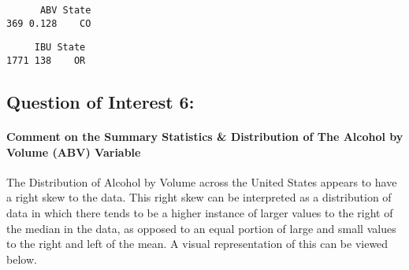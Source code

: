 \documentclass[
]{article}
\newenvironment{Shaded}{\begin{snugshade}}{\end{snugshade}}
\newcommand{\CommentTok}[1]{\textcolor[rgb]{0.56,0.35,0.01}{\textit{#1}}}
\newcommand{\FunctionTok}[1]{\textcolor[rgb]{0.00,0.00,0.00}{#1}}
\newcommand{\NormalTok}[1]{#1}
\newcommand{\OtherTok}[1]{\textcolor[rgb]{0.56,0.35,0.01}{#1}}
\newcommand{\SpecialCharTok}[1]{\textcolor[rgb]{0.00,0.00,0.00}{#1}}
\begin{document}
\begin{verbatim}
      ABV State
369 0.128    CO
\end{verbatim}

\begin{Shaded}
\end{Shaded}

\begin{verbatim}
     IBU State
1771 138    OR
\end{verbatim}

\begin{Shaded}
\end{Shaded}

\hypertarget{question-of-interest-6}{%
\subsection{Question of Interest 6:}\label{question-of-interest-6}}

\hypertarget{comment-on-the-summary-statistics-distribution-of-the-alcohol-by-volume-abv-variable}{%
\paragraph{Comment on the Summary Statistics \& Distribution of The
Alcohol by Volume (ABV)
Variable}\label{comment-on-the-summary-statistics-distribution-of-the-alcohol-by-volume-abv-variable}}

The Distribution of Alcohol by Volume across the United States appears
to have a right skew to the data. This right skew can be interpreted as
a distribution of data in which there tends to be a higher instance of
larger values to the right of the median in the data, as opposed to an
equal portion of large and small values to the right and left of the
mean. A visual representation of this can be viewed below.
\end{document}
